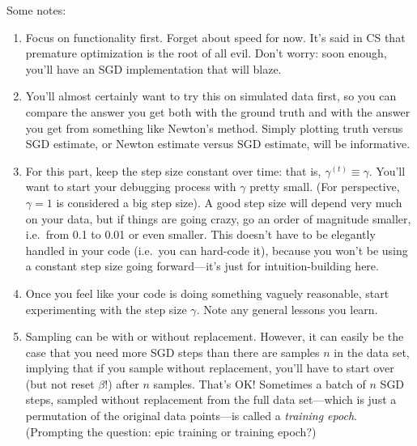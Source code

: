 \documentclass[11 pt]{article}
\begin{document}
\begin{enumerate}[label=(\Alph*)]
	Some notes:
	\begin{enumerate}[label=\arabic*.]
		\item Focus on functionality first.  Forget about speed for now.  It's said in CS that premature optimization is the root of all evil.  Don't worry: soon enough, you'll have an SGD implementation that will blaze.
		\item You'll almost certainly want to try this on simulated data first, so you can compare the answer you get both with the ground truth and with the answer you get from something like Newton's method.  Simply plotting truth versus SGD estimate, or Newton estimate versus SGD estimate, will be informative.
		\item For this part,  keep the step size constant over time: that is, $\gamma^{(t)} \equiv \gamma$.  You'll want to start your debugging process with $\gamma$ pretty small.  (For perspective, $\gamma = 1$ is considered a big step size).  A good step size will depend very much on your data, but if things are going crazy, go an order of magnitude smaller, i.e.~from 0.1 to 0.01 or even smaller.  This doesn't have to be elegantly handled in your code (i.e.~you can hard-code it), because you won't be using a constant step size going forward---it's just for intuition-building here.
		\item Once you feel like your code is doing something vaguely reasonable, start experimenting with the step size $\gamma$.  Note any general lessons you learn.
		\item Sampling can be with or without replacement.  However, it can easily be the case that you need more SGD steps than there are samples $n$ in the data set, implying that if you sample without replacement, you'll have to start over (but not reset $\beta$!) after $n$ samples.   That's OK!  Sometimes a batch of $n$ SGD steps, sampled without replacement from the full data set---which is just a permutation of the original data points---is called a \textit{training epoch}.  (Prompting the question: epic training or training epoch?)
	\end{enumerate}
	

\end{enumerate}
\end{document}
